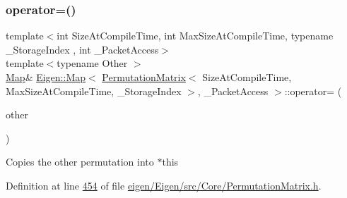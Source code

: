 \mbox{\label{class_eigen_1_1_map_3_01_permutation_matrix_3_01_size_at_compile_time_00_01_max_size_at_compile_2f9d18bf0084dbfb13fbbfe14adaf22d_a15e39faf193bf3d15f75c81096a95e72}} 
\subsubsection{\texorpdfstring{operator=()}{operator=()}\hspace{0.1cm}{\footnotesize\ttfamily [1/6]}}
{\footnotesize\ttfamily template$<$int Size\+At\+Compile\+Time, int Max\+Size\+At\+Compile\+Time, typename \+\_\+\+Storage\+Index , int \+\_\+\+Packet\+Access$>$ \\
template$<$typename Other $>$ \\
\hyperlink{group___core___module_class_eigen_1_1_map}{Map}\& \hyperlink{group___core___module_class_eigen_1_1_map}{Eigen\+::\+Map}$<$ \hyperlink{group___core___module_class_eigen_1_1_permutation_matrix}{Permutation\+Matrix}$<$ Size\+At\+Compile\+Time, Max\+Size\+At\+Compile\+Time, \+\_\+\+Storage\+Index $>$, \+\_\+\+Packet\+Access $>$\+::operator= (\begin{DoxyParamCaption}\item[{const \hyperlink{group___core___module_class_eigen_1_1_permutation_base}{Permutation\+Base}$<$ Other $>$ \&}]{other }\end{DoxyParamCaption})\hspace{0.3cm}{\ttfamily [inline]}}

Copies the other permutation into $\ast$this 

Definition at line \hyperlink{eigen_2_eigen_2src_2_core_2_permutation_matrix_8h_source_l00454}{454} of file \hyperlink{eigen_2_eigen_2src_2_core_2_permutation_matrix_8h_source}{eigen/\+Eigen/src/\+Core/\+Permutation\+Matrix.\+h}.

